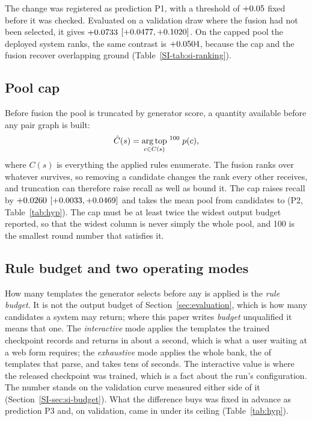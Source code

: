 The change was registered as prediction P1, with a threshold of $+0.05$ fixed
before it was checked. Evaluated on a validation draw where the fusion had not been selected, it
gives $+0.0733$ $[+0.0477, +0.1020]$. On the capped pool the deployed system
ranks, the same contrast is $+0.0504$, because the cap and the fusion recover
overlapping ground (Table~\ref{SI-tab:si-ranking}).

\subsection{Pool cap}

Before fusion the pool is truncated by generator score, a quantity available before any pair graph
is built:
\begin{equation}
\hat{C}(s) = \operatorname*{arg\,top}_{c \in C(s)}{}^{\,100} \; p(c),
\end{equation}
where $C(s)$ is everything the applied rules enumerate.  The
fusion ranks over whatever survives, so removing a candidate changes the rank every other receives,
and truncation can therefore raise recall as well as bound it. The cap raises recall by $+0.0260$ $[+0.0033, +0.0469]$ and takes the mean pool from \numHNinePoolBefore{} candidates to \numHNinePoolAfter{} (P2, Table~\ref{tab:hyp}). The cap must be at
least twice the widest output budget reported, so that the widest column is never simply the whole pool,
and 100 is the smallest round number that satisfies it.

\subsection{Rule budget and two operating modes}
\label{sec:modes}

How many templates the generator selects before any is applied is the \emph{rule budget}. It is
not the output budget of Section~\ref{sec:evaluation}, which is how many candidates a system may
return; where this paper writes \emph{budget} unqualified it means that one. The \emph{interactive} mode applies the \numHOneZeroTopk{} templates the trained
checkpoint records and returns in about a second, which is what a user waiting at a web form
requires; the \emph{exhaustive} mode applies the whole bank, the \numBankParses{} of
\numBankRules{} templates that parse, and takes tens of seconds. The interactive value is where
the released checkpoint was trained, which is a fact about the run's configuration. The
number stands on the validation curve measured either side of it
(Section~\ref{SI-sec:si-budget}). What the difference buys was fixed in advance as prediction P3 and, on validation, came in under its ceiling (Table~\ref{tab:hyp}).

